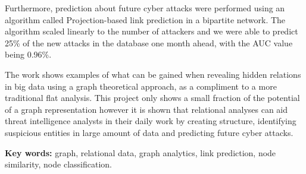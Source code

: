 Furthermore, prediction about future cyber attacks were performed using an algorithm called Projection-based link prediction in a bipartite network. The algorithm scaled linearly to the number of attackers and we were able to predict 25\% of the new attacks in the database one month ahead, with the AUC value being 0.96\%.

The work shows examples of what can be gained when revealing hidden relations in big data using a graph theoretical approach, as a compliment to a more traditional flat analysis. This project only shows a small fraction of the potential of a graph representation however it is shown that relational analyses can aid threat intelligence analysts in their daily work by creating structure, identifying suspicious entities in large amount of data and predicting future cyber attacks.

\vfill
\noindent
\textbf{Key words:} graph, relational data, graph analytics, link prediction, node similarity, node classification.